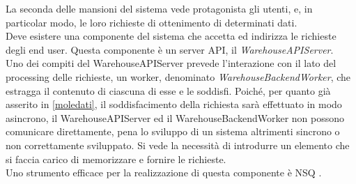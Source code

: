 La seconda delle mansioni del sistema vede protagonista gli utenti, e, in particolar modo, le loro richieste di ottenimento di determinati dati.\\
Deve esistere una componente del sistema che accetta ed indirizza le richieste degli end user. Questa componente è un server API, il \textit{WarehouseAPIServer}. \\
Uno dei compiti del WarehouseAPIServer prevede l'interazione con il lato del processing delle richieste, un worker, denominato \textit{WarehouseBackendWorker}, che estragga il contenuto di ciascuna di esse e le soddisfi. Poiché, per quanto già asserito in \ref{moledati}, il soddisfacimento della richiesta sarà effettuato in modo asincrono, il WarehouseAPIServer ed il WarehouseBackendWorker non possono comunicare direttamente, pena lo sviluppo di un sistema altrimenti sincrono o non correttamente sviluppato. Si vede la necessità di introdurre un elemento che si faccia carico di memorizzare e fornire le richieste.\\
Uno strumento efficace per la realizzazione di questa componente è NSQ \cite{nsqurl}. 

